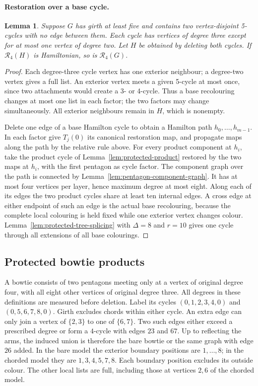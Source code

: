 \documentclass[11pt]{article}
\newtheorem{lemma}[theorem]{Lemma}
\theoremstyle{remark}
\newcommand{\R}{\mathcal R}
\numberwithin{equation}{section}
\numberwithin{table}{section}
\begin{document}
\paragraph{Restoration over a base cycle.}
\begin{lemma}\label{lem:two-pentagons-restore}
Suppose $G$ has girth at least five and contains two vertex-disjoint
5-cycles with no edge between them. Each cycle has vertices of degree
three except for at most one vertex of degree two.
Let $H$ be obtained by deleting both cycles. If $\R_4(H)$ is
Hamiltonian, so is $\R_4(G)$.
\end{lemma}
\begin{proof}
Each degree-three cycle vertex has one exterior neighbour; a
degree-two vertex gives a full list. An exterior vertex meets a
given 5-cycle at most once, since two attachments would create a
3- or 4-cycle. Thus a base recolouring changes at most one list
in each factor; the two factors may change simultaneously.
All exterior neighbours remain in $H$, which is nonempty.

Delete one edge of a base Hamilton cycle to obtain a Hamilton path
$h_0,\ldots,h_{m-1}$. In each factor give $T_j(0)$ its canonical
restoration map, and propagate maps along the path by the relative
rule above. For every product component at $h_i$, take the product
cycle of Lemma~\ref{lem:protected-product} restored by the two maps
at $h_i$, with the first pentagon as cycle factor. The component graph
over the path is connected by Lemma~\ref{lem:pentagon-component-graph}.
It has at most four vertices per layer, hence maximum degree at most
eight. Along each of its edges the two product cycles share at least
ten internal edges. A cross edge at either endpoint of such an edge is
the actual base recolouring, because the complete local colouring is
held fixed while one exterior vertex changes colour.
Lemma~\ref{lem:protected-tree-splicing} with $\Delta=8$ and $r=10$
gives one cycle through all extensions of all base colourings.
\end{proof}


\subsection{Protected bowtie products}
A bowtie consists of two pentagons meeting only at a vertex of original degree four,
with all eight other vertices of original degree three. All degrees in
these definitions are measured before deletion.
Label its cycles $(0,1,2,3,4,0)$ and $(0,5,6,7,8,0)$. Girth excludes
chords within either cycle. An extra edge can only join a vertex of
$\{2,3\}$ to one of $\{6,7\}$. Two such edges either exceed a prescribed
degree or form a $4$-cycle with edges $23$ and $67$. Up to reflecting the
arms, the induced union is therefore the bare bowtie or the same graph
with edge $26$ added. In the bare model the exterior boundary positions are
$1,\ldots,8$; in the chorded model they are $1,3,4,5,7,8$. Each boundary position
excludes its outside colour. The other local lists are full, including
those at vertices $2,6$ of the chorded model.
\end{document}
